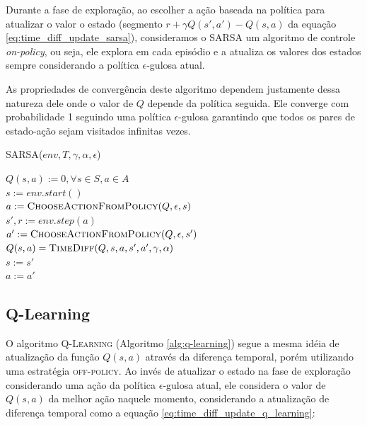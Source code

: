 \documentclass[letterpaper]{article}
\begin{document}
Durante a fase de exploração, ao escolher a ação baseada na política para atualizar o valor o estado (segmento $r + \gamma Q(s', a') - Q(s,a)$ da equação \ref{eq:time_diff_update_sarsa}), consideramos o \textsc{SARSA} um algoritmo de controle \textit{on-policy}, ou seja, ele explora em cada episódio e a atualiza os valores dos estados sempre considerando a política $\epsilon$-gulosa atual.

As propriedades de convergência deste algoritmo dependem justamente dessa natureza dele onde o valor de $Q$ depende da política seguida. Ele converge com probabilidade 1 seguindo uma política $\epsilon$-gulosa garantindo que todos os pares de estado-ação sejam visitados infinitas vezes.

\linesnumbered
\dontprintsemicolon
\begin{algorithm}[t!]
{
	\caption{\textsc{SARSA}($ env, T, \gamma, \alpha, \epsilon $)}
	\label{alg:sarsa}
    $Q(s,a) := 0, \forall s \in S, a \in A $\\

    {
      $s := env.start()$\\
      $a := \textsc{ChooseActionFromPolicy}(Q, \epsilon, s) $\\

      {
        $s', r := env.step(a)$\\
        $a' := \textsc{ChooseActionFromPolicy}(Q, \epsilon, s') $\\
        $Q(s, a) = \textsc{TimeDiff}(Q, s, a, s', a', \gamma, \alpha)$\\
        $s := s'$ \\
        $a := a'$ \\
      }
    }

}
\end{algorithm}

\subsection{Q-Learning}

O algoritmo \textsc{Q-Learning} (Algoritmo \ref{alg:q-learning}) segue a mesma idéia de atualização da função $Q(s,a)$ através da diferença temporal, porém utilizando uma estratégia \textsc{off-policy}. Ao invés de atualizar o estado na fase de exploração considerando uma ação da política $\epsilon$-gulosa atual, ele considera o valor de $Q(s,a)$ da melhor ação naquele momento, considerando a atualização de diferença temporal como a equação \ref{eq:time_diff_update_q_learning}:
\end{document}
